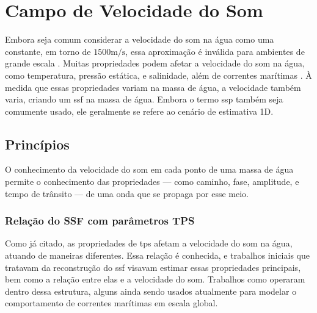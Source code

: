\section{Campo de Velocidade do Som}
\label{sec:campo_de_velocidade_do_som}

Embora seja comum considerar a velocidade do som na água como uma constante, em torno de $1500 \si{\meter/\second}$, essa aproximação é inválida para ambientes de grande escala \cite{kieffer_sound_1977,trusler_determination_2017,li_sound_2015,pinson_sound_2010}. Muitas propriedades podem afetar a velocidade do som na água, como temperatura, pressão estática, e salinidade, além de correntes marítimas \cite{wilson_speed_1959,medwin_fundamentals_1999,mcdougall_getting_2011,delgrosso_new_1974}. À medida que essas propriedades variam na massa de água, a velocidade também varia, criando um \gls{ssf} na massa de água. Embora o termo \gls{ssp} \cite{li_acoustic_2019,li_sound_2015,pinson_sound_2010} também seja comumente usado, ele geralmente se refere ao cenário de estimativa 1D.

\subsection{Princípios}

O conhecimento da velocidade do som em cada ponto de uma massa de água permite o conhecimento das propriedades --- como caminho, fase, amplitude, e tempo de trânsito --- de uma onda que se propaga por esse meio.

\subsubsection*{Relação do SSF com parâmetros TPS}

Como já citado, as propriedades de \gls{tps} afetam a velocidade do som na água, atuando de maneiras diferentes. Essa relação é conhecida, e trabalhos iniciais que tratavam da reconstrução do \gls{ssf} visavam estimar essas propriedades principais, bem como a relação entre elas e a velocidade do som. Trabalhos como \cite{wilson_speed_1959,medwin_fundamentals_1999,mcdougall_getting_2011,delgrosso_new_1974,chen_speed_1977,wong_speed_1995,roquet_accurate_2015,mackenzie_nineterm_1981,wilson_equation_1960} operaram dentro dessa estrutura, alguns ainda sendo usados atualmente para modelar o comportamento de correntes marítimas em escala global.

